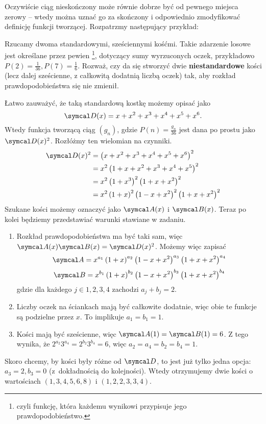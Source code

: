 \documentclass[bibliography=totocnumbered]{scrartcl}
\begin{document}
    Oczywiście ciąg nieskończony może równie dobrze być od pewnego miejsca zerowy -- wtedy można uznać go za skończony i odpowiednio zmodyfikować definicję funkcji tworzącej. Rozpatrzmy następujący przykład:
    \begin{example}
        Rzucamy dwoma standardowymi, sześciennymi kośćmi. Takie zdarzenie losowe jest określane przez pewien \footnote{czyli funkcję, która każdemu wynikowi przypisuje jego prawdopodobieństwo.}, dotyczący sumy wyrzuconych oczek, przykładowo $P(2) = \frac{1}{36}, P(7) = \frac{1}{6}$. Rozważ, czy da się stworzyć dwie \textbf{niestandardowe} kości (lecz dalej sześcienne, z całkowitą dodatnią liczbą oczek) tak, aby rozkład prawdopodobieństwa się nie zmienił.
    \end{example}
    \begin{solution}
        Łatwo zauważyć, że taką standardową kostkę możemy opisać jako
        $$ \sD(x) = x + x^2 + x^3 + x^4 + x^5 + x^6. $$
        Wtedy funkcja tworzącą ciąg $(g_n)$, gdzie $P(n) = \frac{g_n}{36}$ jest dana po prostu jako $\sD(x)^2$. Rozłóżmy ten wielomian na czynniki.
        \begin{align*}
            \sD(x)^2 &= \left(x + x^2 + x^3 + x^4 + x^5 + x^6\right)^2 \\
                    &= x^2\left(1 + x + x^2 + x^3 + x^4 + x^5\right)^2 \\
                    &= x^2\left(1 + x^3\right)^2\left(1 + x + x^2\right)^2 \\
                    &= x^2\left(1 + x\right)^2\left(1 - x + x^2\right)^2\left(1 + x + x^2\right)^2
        \end{align*}
        Szukane kości możemy oznaczyć jako $\sA(x)$ i $\sB(x)$. Teraz po kolei będziemy przedstawiać warunki stawiane w zadaniu.
        \begin{enumerate}
            \item Rozkład prawdopodobieństwa ma być taki sam, więc $\sA(x)\sB(x) = \sD(x)^2$. Możemy więc zapisać
            $$ \sA = x^{a_1}\left(1 + x\right)^{a_2}\left(1 - x + x^2\right)^{a_3}\left(1 + x + x^2\right)^{a_4} $$
            $$ \sB = x^{b_1}\left(1 + x\right)^{b_2}\left(1 - x + x^2\right)^{b_3}\left(1 + x + x^2\right)^{b_4} $$
            gdzie dla każdego $j\in{1,2,3,4}$ zachodzi $a_j + b_j = 2$.
            \item Liczby oczek na ściankach mają być całkowite dodatnie, więc obie te funkcje są podzielne przez $x$. To implikuje $a_1 = b_1 = 1$.
            \item Kości mają być sześcienne, więc $\sA(1) = \sB(1) = 6$. Z tego wynika, że $2^{a_2}3^{a_4} = 2^{b_2}3^{b_4} = 6$, więc $a_2 = a_4 = b_2 = b_4 = 1$.
        \end{enumerate}
        Skoro chcemy, by kości były różne od $\sD$, to jest już tylko jedna opcja: $a_3 = 2, b_3 = 0$ (z~dokładnością do kolejności). Wtedy otrzymujemy dwie kości o wartościach $(1, 3, 4, 5, 6, 8)$ i $(1, 2, 2, 3, 3, 4)$.
    \end{solution}
\end{document}
